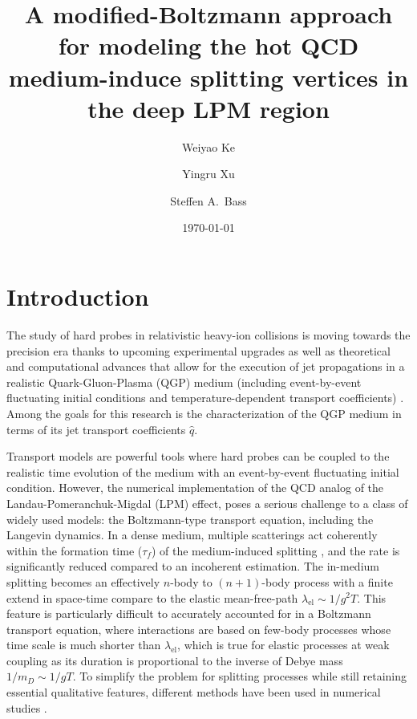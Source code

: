 \documentclass[aps, prc, reprint, amsmath, groupedaddress, nofootinbib]{revtex4-1}
\begin{document}
\title{A modified-Boltzmann approach for modeling the hot QCD medium-induce splitting vertices in the deep LPM region}
\author{Weiyao Ke}
\author{Yingru Xu}
\author{Steffen A.\ Bass}
\date{\today}
\maketitle 

\section{Introduction}
The study of hard probes in relativistic heavy-ion collisions is moving towards the precision era thanks to upcoming experimental upgrades \cite{ATLAS-Collaboration:2012iwa,Abelevetal:2014dna,STAR:upgrade-hf,Adare:2015kwa,CMS:2017dec} as well as theoretical and computational advances that allow for the execution of jet propagations in a realistic Quark-Gluon-Plasma (QGP) medium (including event-by-event fluctuating initial conditions and temperature-dependent transport coefficients) \cite{Wang:1994fx,Zakharov:1996fv,Baier:1996sk,Zakharov:1997uu,Arnold:2002zm,Gyulassy:2003mc,Kovner:2003zj,Jeon:2003gi,CasalderreySolana:2007pr,Djordjevic:2008iz,Bass:2008rv,Schenke:2009gb,Majumder:2009zu,Majumder:2010qh,Armesto:2011ht,Zapp:2011ya,Ovanesyan:2011xy,Kang:2014xsa,Cao:2016gvr,Kauder:2018cdt,Cao:2017zih}. Among the goals for this research is the characterization of the QGP medium in terms of its jet transport coefficients $\hat{q}$.

Transport models are powerful tools where hard probes can be coupled to the realistic time evolution of the medium with an event-by-event fluctuating initial condition. 
However, the numerical implementation of the QCD analog of the Landau-Pomeranchuk-Migdal (LPM) effect, poses a serious challenge to a class of widely used models: the Boltzmann-type transport equation, including the Langevin dynamics.
In a dense medium, multiple scatterings act coherently within the formation time ($\tau_f$) of the medium-induced splitting \cite{PhysRev.103.1811,Wang:1994fx,Zakharov:1996fv,Zakharov:1997uu,Baier:1996kr,Baier:1996sk}, and the rate is significantly reduced compared to an incoherent estimation.
The in-medium splitting becomes an effectively $n$-body to $(n+1)$-body process with a finite extend in space-time compare to the elastic mean-free-path $\lambda_{\textrm{el}} \sim 1/g^2T$.
This feature is particularly difficult to accurately accounted for in a Boltzmann transport equation, where interactions are based on few-body processes whose time scale is much shorter than $\lambda_{\textrm{el}}$, which is true for elastic processes at weak coupling as its duration is proportional to the inverse of Debye mass $1/m_D \sim 1/gT$.
To simplify the problem for splitting processes while still retaining essential qualitative features, different methods have been used in numerical studies \cite{Cao:2013ita,ColemanSmith:2012vr,Xu:2004mz,Zapp:2011ya,Gossiaux:2012cv,Park:thesis}.
\end{document}
